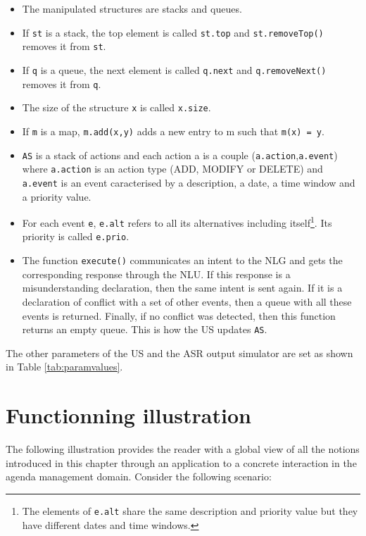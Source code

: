 				\begin{itemize}
					\item The manipulated structures are stacks and queues.
					\item If \texttt{st} is a stack, the top element is called \texttt{st.top} and \texttt{st.removeTop()} removes it from \texttt{st}.
					\item If \texttt{q} is a queue, the next element is called \texttt{q.next} and \texttt{q.removeNext()} removes it from \texttt{q}.
					\item The size of the structure \texttt{x} is called \texttt{x.size}.
					\item If \texttt{m} is a map, \texttt{m.add(x,y)} adds a new entry to m such that \texttt{m(x) = y}.
					\item \texttt{AS} is a stack of actions and each action a is a couple (\texttt{a.action},\texttt{a.event}) where \texttt{a.action} is an action type (ADD, MODIFY or DELETE) and \texttt{a.event} is an event caracterised by a description, a date, a time window and a priority value.
					\item For each event \texttt{e}, \texttt{e.alt} refers to all its alternatives including itself\footnote{The elements of \texttt{e.alt} share the same description and priority value but they have different dates and time windows.}. Its priority is called \texttt{e.prio}.
					\item The function \texttt{execute()} communicates an intent to the NLG and gets the corresponding response through the NLU. If this response is a misunderstanding declaration, then the same intent is sent again. If it is a declaration of conflict with a set of other events, then a queue with all these events is returned. Finally, if no conflict was detected, then this function returns an empty queue. This is how the US updates \texttt{AS}.
				\end{itemize}
						
					The other parameters of the US and the ASR output simulator are set as shown in Table \ref{tab:paramvalues}.
					
\section{Functionning illustration}
			
				The following illustration provides the reader with a global view of all the notions introduced in this chapter through an application to a concrete interaction in the agenda management domain. Consider the following scenario:
				
